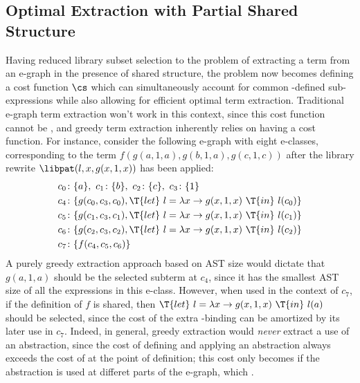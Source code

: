 
\subsection{Optimal Extraction with Partial Shared Structure}

Having reduced library subset selection to the problem of extracting
a term from an e-graph in the presence of shared structure, the problem
now becomes defining a cost function $\cs$ which can simultaneously
account for common -defined sub-expressions while also allowing
for efficient optimal term extraction.
%
Traditional e-graph term extraction won't work in this context, since
this cost function cannot be , and greedy term extraction
inherently relies on having a  cost function.
%
For instance, consider the following e-graph with eight e-classes,
corresponding to the term $f(g(a, 1, a), g(b, 1, a), g(c, 1, c))$
after the library rewrite $\libpat(l, x, g(x, 1, x))$ has been applied:
%
\begin{align*}
c_0&\colon \{ a \},\ c_1\colon \{ b \},\ c_2\colon \{ c \},\ c_3\colon \{ 1 \} \\
c_4&\colon \{ g(c_0, c_3, c_0), \T{let}\ l = \lambda x \to g(x, 1, x)\ \T{in}\ l(c_0) \} \\
c_5&\colon \{ g(c_1, c_3, c_1), \T{let}\ l = \lambda x \to g(x, 1, x)\ \T{in}\ l(c_1) \} \\
c_6&\colon \{ g(c_2, c_3, c_2), \T{let}\ l = \lambda x \to g(x, 1, x)\ \T{in}\ l(c_2) \} \\
c_7&\colon \{ f(c_4, c_5, c_6) \} \\
\end{align*}
%
A purely greedy extraction approach based on AST size would dictate that
$g(a, 1, a)$ should be the selected subterm at $c_4$, since it has the smallest
AST size of all the expressions in this e-class.
%
However, when used in the context of $c_7$, if the definition of $f$
is shared, then $\T{let}\ l = \lambda x \to g(x, 1, x)\ \T{in}\ l(a)$
should be selected, since the cost of the extra -binding
can be amortized by its later use in $c_7$.
%
Indeed, in general, greedy extraction would \emph{never} extract a
use of an abstraction, since the cost of defining and applying
an abstraction always exceeds the cost of  at the point of definition;
this cost only becomes  if the abstraction is
used at differet parts of the e-graph, which .

